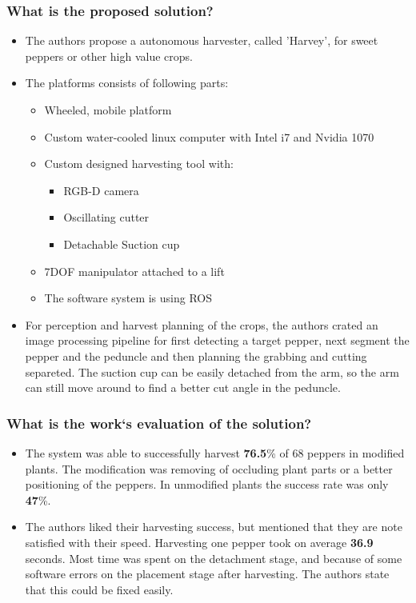     \subsubsection*{What is the proposed solution?}
    \begin{itemize}
        \item The authors propose a autonomous harvester, called 'Harvey', for sweet peppers or other high value crops.
        \item The platforms consists of following parts: \ \begin{itemize}
            \item Wheeled, mobile platform
            \item Custom water-cooled linux computer with Intel i7 and Nvidia 1070
            \item Custom designed harvesting tool with: \ \begin{itemize}
                \item RGB-D camera
                \item Oscillating cutter
                \item Detachable Suction cup
            \end{itemize}
            \item 7DOF manipulator attached to a lift
            \item The software system is using ROS 
        \end{itemize} 
        \item For perception and harvest planning of the crops, the authors crated an image processing pipeline for first detecting a target pepper, next segment the pepper and the peduncle and then planning the grabbing and cutting separeted. The suction cup can be easily detached from the arm, so the arm can still move around to find a better cut angle in the peduncle.
    \end{itemize}
    \subsubsection*{What is the work`s evaluation of the solution?}
    \begin{itemize}
        \item The system was able to successfully harvest \textbf{76.5}\% of 68 peppers in modified plants. The modification was removing of occluding plant parts or a better positioning of the peppers. In unmodified plants the success rate was only \textbf{47}\%.
        \item The authors liked their harvesting success, but mentioned that they are note satisfied with their speed. Harvesting one pepper took on average \textbf{36.9} seconds. Most time was spent on the detachment stage, and because of some software errors on the placement stage after harvesting. The authors state that this could be fixed easily.
    \end{itemize}
